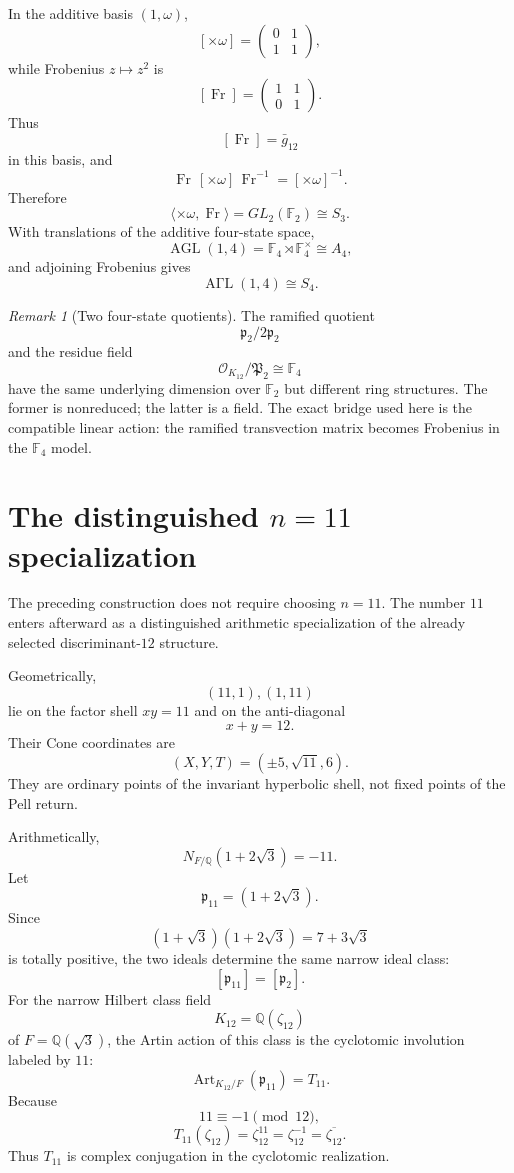 \documentclass[11pt]{article}
\theoremstyle{definition}
\theoremstyle{remark}
\newtheorem{remark}[theorem]{Remark}
\newcommand{\Q}{\mathbb Q}
\newcommand{\F}{\mathbb F}
\newcommand{\OO}{\mathcal O}
\newcommand{\Fr}{\operatorname{Fr}}
\newcommand{\Art}{\operatorname{Art}}
\begin{document}
In the additive basis $(1,\omega)$,
\[
[\times\omega]
=\begin{pmatrix}0&1\\1&1\end{pmatrix},
\]
while Frobenius $z\mapsto z^2$ is
\[
[\Fr]
=\begin{pmatrix}1&1\\0&1\end{pmatrix}.
\]
Thus
\[
\boxed{[\Fr]=\bar g_{12}}
\]
in this basis, and
\[
\Fr\,[\times\omega]\,\Fr^{-1}
=[\times\omega]^{-1}.
\]
Therefore
\[
\langle\times\omega,\Fr\rangle
=GL_2(\F_2)\cong S_3.
\]
With translations of the additive four-state space,
\[
\operatorname{AGL}(1,4)
=\F_4\rtimes\F_4^\times
\cong A_4,
\]
and adjoining Frobenius gives
\[
\operatorname{A\Gamma L}(1,4)
\cong S_4.
\]

\begin{remark}[Two four-state quotients]
The ramified quotient
\[
\mathfrak p_2/2\mathfrak p_2
\]
and the residue field
\[
\OO_{K_{12}}/\mathfrak P_2\cong\F_4
\]
have the same underlying dimension over $\F_2$ but different ring
structures.  The former is nonreduced; the latter is a field.  The exact
bridge used here is the compatible linear action: the ramified transvection
matrix becomes Frobenius in the $\F_4$ model.
\end{remark}

\section{The distinguished $n=11$ specialization}

The preceding construction does not require choosing $n=11$.  The number
$11$ enters afterward as a distinguished arithmetic specialization of the
already selected discriminant-$12$ structure.

Geometrically,
\[
(11,1),(1,11)
\]
lie on the factor shell $xy=11$ and on the anti-diagonal
\[
x+y=12.
\]
Their Cone coordinates are
\[
\boxed{(X,Y,T)=(\pm5,\sqrt{11},6).}
\]
They are ordinary points of the invariant hyperbolic shell, not fixed points
of the Pell return.

Arithmetically,
\[
N_{F/\Q}(1+2\sqrt3)=-11.
\]
Let
\[
\mathfrak p_{11}=(1+2\sqrt3).
\]
Since
\[
(1+\sqrt3)(1+2\sqrt3)=7+3\sqrt3
\]
is totally positive, the two ideals determine the same narrow ideal class:
\[
\boxed{[\mathfrak p_{11}]=[\mathfrak p_2].}
\]
For the narrow Hilbert class field
\[
K_{12}=\Q(\zeta_{12})
\]
of $F=\Q(\sqrt3)$, the Artin action of this class is the cyclotomic
involution labeled by $11$:
\[
\boxed{\Art_{K_{12}/F}(\mathfrak p_{11})=T_{11}.}
\]
Because
\[
11\equiv-1\pmod{12},
\]
\[
T_{11}(\zeta_{12})
=\zeta_{12}^{11}
=\zeta_{12}^{-1}
=\overline{\zeta_{12}}.
\]
Thus $T_{11}$ is complex conjugation in the cyclotomic realization.
\end{document}
